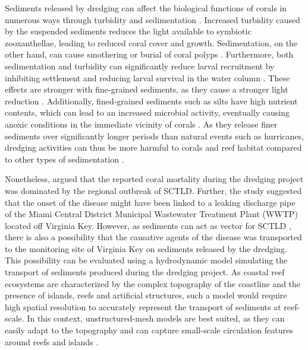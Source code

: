 \documentclass[preprint,12pt,authoryear]{elsarticle}
\begin{document}
Sediments released by dredging can affect the biological functions of corals in numerous ways  through turbidity and sedimentation \citep{erftemeijer2012environmental, jones2015effects}. Increased turbidity caused by the suspended sediments reduces the light available to symbiotic zooxanthellae, leading to reduced coral cover and growth. Sedimentation, on the other hand, can cause smothering or burial of coral polyps \citep{erftemeijer2012environmental}. Furthermore, both sedimentation and turbidity can significantly reduce larval recruitment by inhibiting settlement and reducing larval survival in the water column \citep{jones2015effects}. These effects are stronger with fine-grained sediments, as they cause a stronger light reduction \citep{fourney2017additive}. Additionally, fined-grained sediments such as silts have high nutrient contents, which can lead to an increased microbial activity, eventually causing anoxic conditions in the immediate vicinity of corals \citep{weber2012mechanisms}. As they release finer sediments over significantly longer periods than natural events such as hurricanes, dredging activities can thus be more harmful to corals and reef habitat compared to other types of sedimentation \citep{cunning2019extensive}.

Nonetheless, \cite{gintert2019regional} argued that the reported coral mortality during the dredging project was dominated by the regional outbreak of SCTLD. Further, the study suggested that the onset of the disease might have been linked to a leaking discharge pipe of the Miami Central District Municipal Wastewater Treatment Plant (WWTP) located off Virginia Key. However, as sediments can act as vector for SCTLD \citep{studivan2022reef}, there is also a possibility that the causative agents of the disease was transported to the monitoring site of Virginia Key on sediments released by the dredging. This possibility can be evaluated using a hydrodynamic model simulating the transport of sediments produced during the dredging project. As coastal reef ecosystems are characterized by the complex topography of the coastline and the presence of islands, reefs and artificial structures, such a model would require high spatial resolution to accurately represent the transport of sediments at reef-scale. In this context, unstructured-mesh models are best suited, as they can easily adapt to the topography \citep{fringer2019future} and can capture small-scale circulation features around reefs and islands \citep{lambrechts2008multi}.
\end{document}
